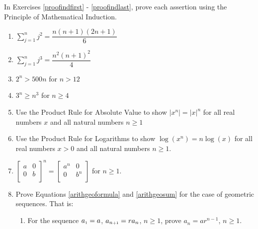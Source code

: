\documentclass{ximera}
\begin{document}
	\author{Stitz-Zeager}



In Exercises \ref{proofindfirst} - \ref{proofindlast}, prove each assertion using the Principle of Mathematical Induction.

\begin{enumerate}

\item  $\displaystyle{ \sum_{j=1}^{n} j^2 = \dfrac{n(n+1)(2n+1)}{6}}$ \label{proofindfirst}

\item  $\displaystyle{ \sum_{j=1}^{n} j^3 = \dfrac{n^2(n+1)^2}{4}}$

\item  $2^{n} > 500 n$ for $n > 12$

\item  $3^{n} \geq n^3$ for $n \geq 4$

\item  Use the Product Rule for Absolute Value to show  $\left|x^{n}\right| = |x|^{n}$ for all real numbers $x$ and all natural numbers $n \geq 1$

\item  Use the Product Rule for Logarithms to show $\log\left(x^{n}\right) = n \log(x)$ for all real numbers $x > 0$ and all natural numbers $n \geq 1$.

\item  $\left[ \begin{array}{cc} a & 0 \\ 0 & b \\ \end{array} \right]^{n} = \left[ \begin{array}{cc} a^{n} & 0 \\ 0 & b^{n} \\ \end{array} \right]$ for $n \geq 1$. \label{proofindlast}


\item  Prove Equations \ref{arithgeoformula} and \ref{arithgeosum} for the case of geometric sequences.  That is:

\begin{enumerate}

\item \label{proofgeosequeneex} For the sequence  $a_{\mbox{\tiny $1$}} = a$, $a_{n\mbox{\tiny{$+1$}}} = r a_{n}$, $n \geq 1$, prove $a_{n} = ar^{n-1}$, $n \geq 1$.


\end{enumerate}
\end{enumerate}
\end{document}
